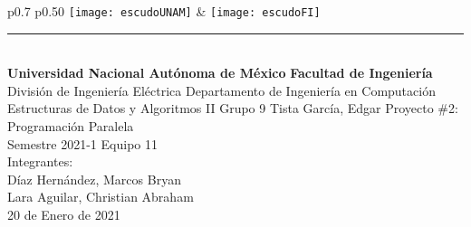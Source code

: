 \begin{titlepage}
	\begin{center}
		{ 
			\begin{tabular}{p{0.7\textwidth} p{0.50\textwidth} }
				\texttt{[image: escudoUNAM]} &  \texttt{[image: escudoFI]}
			\end{tabular}
		}
		
		\textcolor{azul}{\rule{\linewidth}{0.8mm}}\\
		\vfill
		{\LARGE \textbf{Universidad Nacional Autónoma de México}}
		\vfill
		{\LARGE \textbf{Facultad de Ingeniería}}
		\vfill
		{\Large {División de Ingeniería Eléctrica}}
		\vfill
		{\Large {Departamento de Ingeniería en Computación}}
		\vfill
		{\huge {Estructuras de Datos y Algoritmos II}}
		\vfill
		{\LARGE {Grupo 9}}
		\vfill
		{\LARGE {Tista García, Edgar}}
		\vfill
		{\LARGE {Proyecto \#2: Programación Paralela\\}}
		\vspace{3mm}
		{\LARGE {Semestre 2021-1}}
		\vfill
		{\Large {Equipo 11\\}}
		\vfill
		{\Large {Integrantes:\\}}
		\vspace{3mm}
		{\Large {Díaz Hernández, Marcos Bryan\\}}
		\vspace{3mm}
		{\Large {Lara Aguilar, Christian Abraham\\}}
		\vfill
		{\LARGE {20 de Enero de 2021}}
	\end{center}
\end{titlepage}